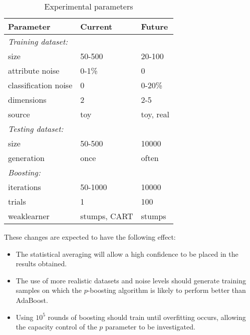 \begin{table}\begin{center}
\begin{minipage}{\linewidth}\begin{center}
\renewcommand{\thefootnote}{\thempfootnote} %
\begin{tabular}{l l l}
\textbf{Parameter}			& \textbf{Current} & \textbf{Future} \\
\hline \hline
\emph{Training dataset:} & & \\
size					& 50-500	& 20-100 \\
attribute noise				& 0-1\%		& 0 \\
classification noise			& 0		& 0-20\% \\
dimensions				& 2		& 2-5 \\
source\sourcefn				& toy		& toy, real \\
\hline
\emph{Testing dataset:} & & \\
size					& 50-500	& 10000 \\
generation				& once		& often \\
\hline
\emph{Boosting:} & & \\
iterations				& 50-1000	& 10000 \\
trials\trialfn				& 1		& 100 \\
weaklearner				& stumps, CART	& stumps \\
\hline
\end{tabular}\end{center}
\end{minipage}
\caption{Experimental parameters}
\label{table:experimental technique}
\end{center}\end{table}

These changes are expected to have the following effect:
\begin{itemize}
\item	The statistical averaging will allow a high confidence to be
	placed in the results obtained.
\item	The use of more realistic datasets and noise levels should
	generate training samples on which the $p$-boosting algorithm
	is likely to perform better than AdaBoost.
\item	Using $10^5$ rounds of boosting should train until overfitting
	occurs, allowing the capacity control of the $p$ parameter to
	be investigated.
\end{itemize}


